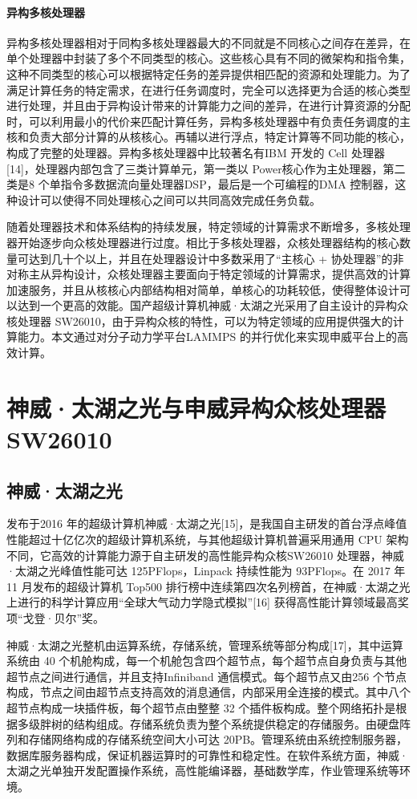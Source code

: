 \paragraph{异构多核处理器}
异构多核处理器相对于同构多核处理器最大的不同就是不同核心之间存在差异，在单个处理器中封装了多个不同类型的核心。这些核心具有不同的微架构和指令集，这种不同类型的核心可以根据特定任务的差异提供相匹配的资源和处理能力。为了满足计算任务的特定需求，在进行任务调度时，完全可以选择更为合适的核心类型进行处理，并且由于异构设计带来的计算能力之间的差异，在进行计算资源的分配时，可以利用最小的代价来匹配计算任务，异构多核处理器中有负责任务调度的主核和负责大部分计算的从核核心。再辅以进行浮点，特定计算等不同功能的核心，构成了完整的处理器。异构多核处理器中比较著名有IBM 开发的 Cell 处理器[14]，处理器内部包含了三类计算单元，第一类以 Power核心作为主处理器，第二类是8 个单指令多数据流向量处理器DSP，最后是一个可编程的DMA 控制器，这种设计可以使得不同处理核心之间可以共同高效完成任务负载。

随着处理器技术和体系结构的持续发展，特定领域的计算需求不断增多，多核处理器开始逐步向众核处理器进行过度。相比于多核处理器，众核处理器结构的核心数量可达到几十个以上，并且在处理器设计中多数采用了“主核心 + 协处理器”的非对称主从异构设计，众核处理器主要面向于特定领域的计算需求，提供高效的计算加速服务，并且从核核心内部结构相对简单，单核心的功耗较低，使得整体设计可以达到一个更高的效能。国产超级计算机神威·太湖之光采用了自主设计的异构众核处理器 SW26010，由于异构众核的特性，可以为特定领域的应用提供强大的计算能力。本文通过对分子动力学平台LAMMPS 的并行优化来实现申威平台上的高效计算。
\section{神威·太湖之光与申威异构众核处理器 SW26010}
\subsection{神威·太湖之光}
发布于2016 年的超级计算机神威·太湖之光[15]，是我国自主研发的首台浮点峰值性能超过十亿亿次的超级计算机系统，与其他超级计算机普遍采用通用 CPU 架构不同，它高效的计算能力源于自主研发的高性能异构众核SW26010 处理器，神威·太湖之光峰值性能可达 125PFlops，Linpack 持续性能为 93PFlops。在 2017 年 11 月发布的超级计算机 Top500 排行榜中连续第四次名列榜首，在神威·太湖之光上进行的科学计算应用“全球大气动力学隐式模拟”[16] 获得高性能计算领域最高奖项“戈登·贝尔”奖。

神威·太湖之光整机由运算系统，存储系统，管理系统等部分构成[17]，其中运算系统由 40 个机舱构成，每一个机舱包含四个超节点，每个超节点自身负责与其他超节点之间进行通信，并且支持Infiniband 通信模式。每个超节点又由256 个节点构成，节点之间由超节点支持高效的消息通信，内部采用全连接的模式。其中八个超节点构成一块插件板，每个超节点由整整 32 个插件板构成。整个网络拓扑是根据多级胖树的结构组成。存储系统负责为整个系统提供稳定的存储服务。由硬盘阵列和存储网络构成的存储系统空间大小可达 20PB。管理系统由系统控制服务器，数据库服务器构成，保证机器运算时的可靠性和稳定性。在软件系统方面，神威·太湖之光单独开发配置操作系统，高性能编译器，基础数学库，作业管理系统等环境。
